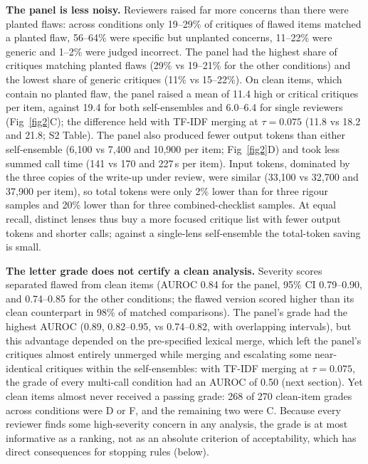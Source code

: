 \textbf{The panel is less noisy.} Reviewers raised far more concerns than there were planted flaws: across conditions only 19--29\% of critiques of flawed items matched a planted flaw, 56--64\% were specific but unplanted concerns, 11--22\% were generic and 1--2\% were judged incorrect. The panel had the highest share of critiques matching planted flaws (29\% vs 19--21\% for the other conditions) and the lowest share of generic critiques (11\% vs 15--22\%). On clean items, which contain no planted flaw, the panel raised a mean of 11.4 high or critical critiques per item, against 19.4 for both self-ensembles and 6.0--6.4 for single reviewers (Fig~\ref{fig2}C); the difference held with TF-IDF merging at $\tau=0.075$ (11.8 vs 18.2 and 21.8; S2 Table). The panel also produced fewer output tokens than either self-ensemble (6,100 vs 7,400 and 10,900 per item; Fig~\ref{fig2}D) and took less summed call time (141 vs 170 and 227\,s per item). Input tokens, dominated by the three copies of the write-up under review, were similar (33,100 vs 32,700 and 37,900 per item), so total tokens were only 2\% lower than for three rigour samples and 20\% lower than for three combined-checklist samples. At equal recall, distinct lenses thus buy a more focused critique list with fewer output tokens and shorter calls; against a single-lens self-ensemble the total-token saving is small.

\textbf{The letter grade does not certify a clean analysis.} Severity scores separated flawed from clean items (AUROC 0.84 for the panel, 95\% CI 0.79--0.90, and 0.74--0.85 for the other conditions; the flawed version scored higher than its clean counterpart in 98\% of matched comparisons). The panel's grade had the highest AUROC (0.89, 0.82--0.95, vs 0.74--0.82, with overlapping intervals), but this advantage depended on the pre-specified lexical merge, which left the panel's critiques almost entirely unmerged while merging and escalating some near-identical critiques within the self-ensembles: with TF-IDF merging at $\tau=0.075$, the grade of every multi-call condition had an AUROC of 0.50 (next section). Yet clean items almost never received a passing grade: 268 of 270 clean-item grades across conditions were D or F, and the remaining two were C. Because every reviewer finds some high-severity concern in any analysis, the grade is at most informative as a ranking, not as an absolute criterion of acceptability, which has direct consequences for stopping rules (below).
